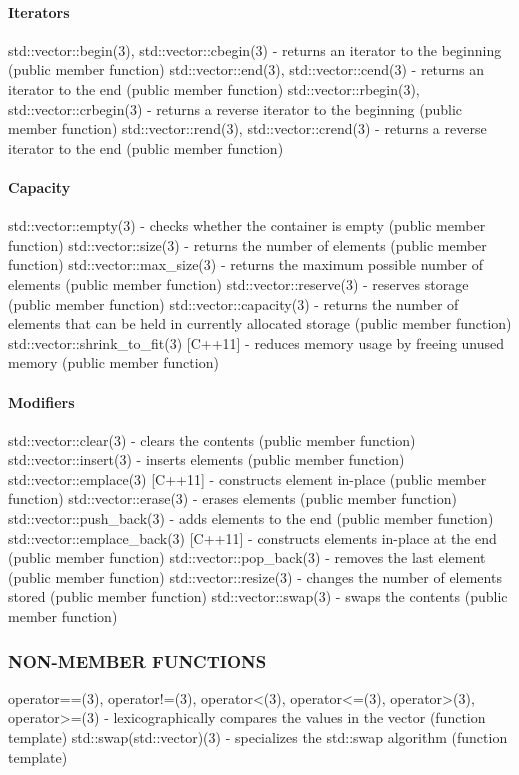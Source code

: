 \paragraph{Iterators}
std::vector::begin(3), std::vector::cbegin(3) - returns an iterator to the beginning   (public member function)
std::vector::end(3), std::vector::cend(3) - returns an iterator to the end   (public member function)
std::vector::rbegin(3), std::vector::crbegin(3) - returns a reverse iterator to the beginning   (public member function)
std::vector::rend(3), std::vector::crend(3) - returns a reverse iterator to the end   (public member function)
\paragraph{Capacity}
std::vector::empty(3) - checks whether the container is empty   (public member function)
std::vector::size(3) - returns the number of elements   (public member function)
std::vector::max\_size(3) - returns the maximum possible number of elements   (public member function)
std::vector::reserve(3) - reserves storage  (public member function)
std::vector::capacity(3) - returns the number of elements that can be held in currently allocated storage   (public member function)
std::vector::shrink\_to\_fit(3) [C++11] - reduces memory usage by freeing unused memory   (public member function)
\paragraph{Modifiers}
std::vector::clear(3) - clears the contents   (public member function)
std::vector::insert(3) - inserts elements   (public member function)
std::vector::emplace(3) [C++11] - constructs element in-place   (public member function)
std::vector::erase(3) - erases elements   (public member function)
std::vector::push\_back(3) - adds elements to the end  (public member function)
std::vector::emplace\_back(3) [C++11] - constructs elements in-place at the end   (public member function)
std::vector::pop\_back(3) - removes the last element   (public member function)
std::vector::resize(3) - changes the number of elements stored   (public member function)
std::vector::swap(3) - swaps the contents   (public member function)

\subsubsection{NON-MEMBER FUNCTIONS}
operator==(3), operator!=(3), operator<(3), operator<=(3), operator>(3), operator>=(3) - lexicographically compares the values in the vector   (function template)
std::swap(std::vector)(3) - specializes the std::swap algorithm   (function template)


